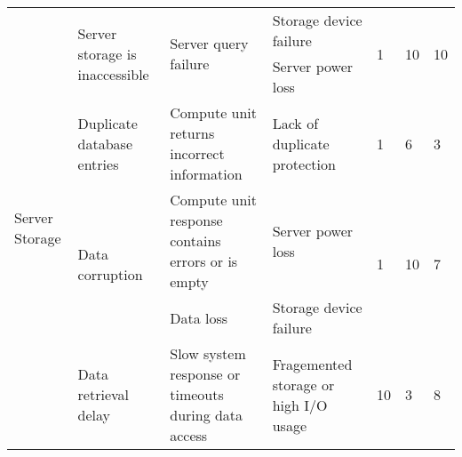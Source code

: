 \documentclass{article}
\begin{document}
\begin{landscape}
\begin{table}[]
{\begin{tabular}{|l|l|l|l|l|l|l|}
    \multirow{7}{*}{Server Storage} & \multirow{2}{*}{Server storage is inaccessible} & \multirow{2}{*}{Server query failure} & Storage device failure & \multirow{2}{*}{1} & \multirow{2}{*}{10} & \multirow{2}{*}{10} \\
     &  &  & Server power loss &  &  &  \\ \cline{2-7} 
     & \multirow{2}{*}{Duplicate database entries} & \multirow{2}{*}{Compute unit returns incorrect information} & \multirow{2}{*}{Lack of duplicate protection} & \multirow{2}{*}{1} & \multirow{2}{*}{6} & \multirow{2}{*}{3} \\
     &  &  &  &  &  &  \\ \cline{2-7} 
     & \multirow{2}{*}{Data corruption} & Compute unit response contains errors or is empty & Server power loss & \multirow{2}{*}{1} & \multirow{2}{*}{10} & \multirow{2}{*}{7} \\
     &  & Data loss & Storage device failure &  &  &  \\ \cline{2-7} 
     & Data retrieval delay & Slow system response or timeouts during data access & Fragemented storage or high I/O usage & 10 & 3 & 8 \\ \hline
    \end{tabular}
    }
\end{table}


\end{landscape}
\end{document}
